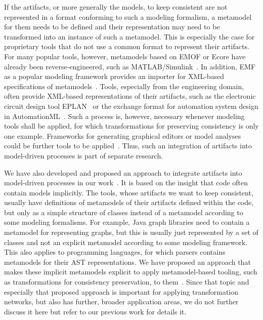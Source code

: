 If the artifacts, or more generally the models, to keep consistent are not represented in a format conforming to such a modeling formalism, a metamodel for them needs to be defined and their representation may need to be transformed into an instance of such a metamodel.
This is especially the case for proprietary tools that do not use a common format to represent their artifacts.
For many popular tools, however, metamodels based on \gls{EMOF} or Ecore have already been reverse-engineered, such as 
MATLAB/Simulink~\cite{heinzemann2013Reconfiguration-CBSE,son2012Simulink-CAGGIE,armengaud2011Safety-WCE}.
In addition, \gls{EMF} as a popular modeling framework provides an importer for XML-based specifications of metamodels~\cite[pp.\ 86]{steinberg2009emf}.
Tools, especially from the engineering domain, often provide XML-based representations of their artifacts, such as the electronic circuit design tool EPLAN~\cite{eplan} or the exchange format for automation system design in AutomationML~\cite{automationML}.
Such a process is, however, necessary whenever modeling tools shall be applied, for which transformations for preserving consistency is only one example.
Frameworks for generating graphical editors or model analyses could be further tools to be applied~.
Thus, such an integration of artifacts into model-driven processes is part of separate research.

We have also developed and proposed an approach to integrate artifacts into model-driven processes in our work~.
It is based on the insight that code often contain models implicitly.
The tools, whose artifacts we want to keep consistent, usually have definitions of metamodels of their artifacts defined within the code, but only as a simple structure of classes instead of a metamodel according to some modeling formalisms.
For example, Java graph libraries need to contain a metamodel for representing graphs, but this is usually just represented by a set of classes and not an explicit metamodel according to some modeling framework.
This also applies to programming languages, for which parsers contains metamodels for their \gls{AST} representations.
We have proposed an approach that makes these implicit metamodels explicit to apply metamodel-based tooling, such as transformations for consistency preservation, to them~.
Since that topic and especially that proposed approach is important for applying transformation networks, but also has further, broader application areas, we do not further discuss it here but refer to our previous work for details it.


